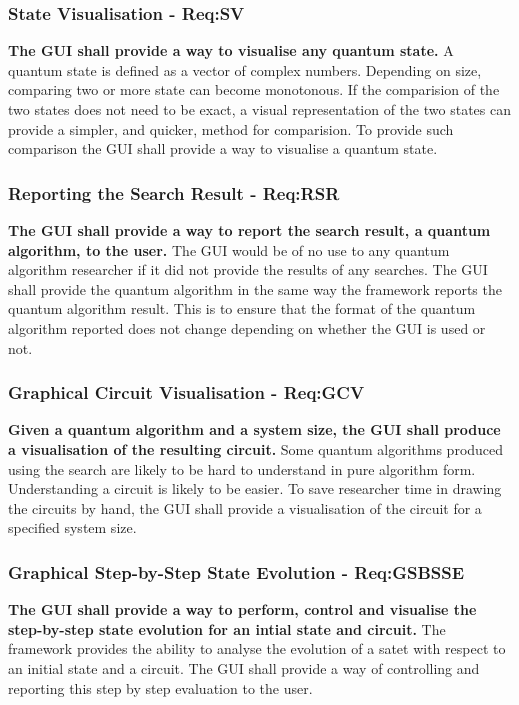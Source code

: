 \subsubsection{State Visualisation - Req:SV}
\label{sec:reqsv}
\textbf{The GUI shall provide a way to visualise any quantum state.}
A quantum state is defined as a vector of complex numbers.
Depending on size, comparing two or more state can become monotonous.
If the comparision of the two states does not need to be exact, a visual representation of the two states can provide a simpler, and quicker, method for comparision.
To provide such comparison the GUI shall provide a way to visualise a quantum state.

\subsubsection{Reporting the Search Result - Req:RSR}
\label{sec:reqrsr}
\textbf{The GUI shall provide a way to report the search result, a quantum algorithm, to the user.}
The GUI would be of no use to any quantum algorithm researcher if it did not provide the results of any searches.
The GUI shall provide the quantum algorithm in the same way the framework reports the quantum algorithm result.
This is to ensure that the format of the quantum algorithm reported does not change depending on whether the GUI is used or not.

\subsubsection{Graphical Circuit Visualisation - Req:GCV}
\label{sec:reqgcv}
\textbf{Given a quantum algorithm and a system size, the GUI shall produce a visualisation of the resulting circuit.}
Some quantum algorithms produced using the search are likely to be hard to understand in pure algorithm form.
Understanding a circuit is likely to be easier.
To save researcher time in drawing the circuits by hand, the GUI shall provide a visualisation of the circuit for a specified system size.

\subsubsection{Graphical Step-by-Step State Evolution - Req:GSBSSE}
\label{sec:reqgsbsse}
\textbf{The GUI shall provide a way to perform, control and visualise the step-by-step state evolution for an intial state and circuit.}
The framework provides the ability to analyse the evolution of a satet with respect to an initial state and a circuit.
The GUI shall provide a way of controlling and reporting this step by step evaluation to the user.

